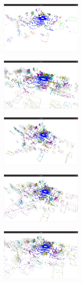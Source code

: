 \documentclass[8pt]{article}
\theoremstyle{nonumberplain}
\begin{document}
\begin{figure}[H]
	\centering
	\begin{minipage}[t]{0.3\textwidth}
		\centering
		\includegraphics[width=4cm]{fig4a.png}
		\label{fig4a}
	\end{minipage}
	\begin{minipage}[t]{0.3\textwidth}
		\centering
		\includegraphics[width=4cm]{fig4e.png}
		\label{fig4b}
	\end{minipage}
	\begin{minipage}[t]{0.3\textwidth}
		\centering
		\includegraphics[width=4cm]{fig4b.png}
		\label{fig4c}
	\end{minipage}
	\begin{minipage}[t]{0.3\textwidth}
		\centering
		\includegraphics[width=4cm]{fig4c.png}
		\label{fig4d}
	\end{minipage}
	\begin{minipage}[t]{0.3\textwidth}
		\centering
		\includegraphics[width=4cm]{fig4d.png}

\end{minipage}
\end{figure}
\end{document}
